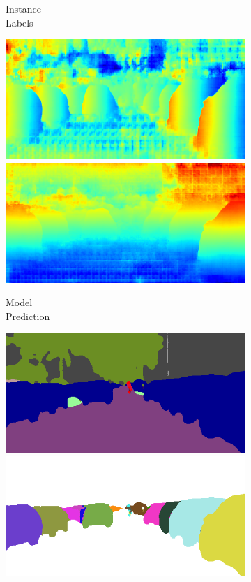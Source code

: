 \begin{figure}[t]
\begin{center}
\begin{subfigure}[t]{0.24\linewidth}
  \caption{Instance\\Labels}
\end{subfigure}
\begin{subfigure}[t]{0.24\linewidth}
  \includegraphics[width=\linewidth]{figures/instance_x.png}
  \includegraphics[width=\linewidth]{figures/instance_y.png}
  \caption{Model\\Prediction}
\end{subfigure}
\begin{subfigure}[t]{0.24\linewidth}
  \includegraphics[width=\linewidth]{figures/segmentation.png}
  \includegraphics[width=\linewidth]{figures/instance_segmentation.png}

\end{subfigure}
\end{center}
\end{figure}
